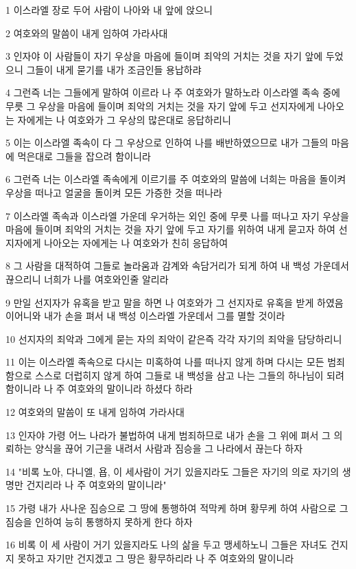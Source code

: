 \par 1 이스라엘 장로 두어 사람이 나아와 내 앞에 앉으니
\par 2 여호와의 말씀이 내게 임하여 가라사대
\par 3 인자야 이 사람들이 자기 우상을 마음에 들이며 죄악의 거치는 것을 자기 앞에 두었으니 그들이 내게 묻기를 내가 조금인들 용납하랴
\par 4 그런즉 너는 그들에게 말하여 이르라 나 주 여호와가 말하노라 이스라엘 족속 중에 무릇 그 우상을 마음에 들이며 죄악의 거치는 것을 자기 앞에 두고 선지자에게 나아오는 자에게는 나 여호와가 그 우상의 많은대로 응답하리니
\par 5 이는 이스라엘 족속이 다 그 우상으로 인하여 나를 배반하였으므로 내가 그들의 마음에 먹은대로 그들을 잡으려 함이니라
\par 6 그런즉 너는 이스라엘 족속에게 이르기를 주 여호와의 말씀에 너희는 마음을 돌이켜 우상을 떠나고 얼굴을 돌이켜 모든 가증한 것을 떠나라
\par 7 이스라엘 족속과 이스라엘 가운데 우거하는 외인 중에 무릇 나를 떠나고 자기 우상을 마음에 들이며 죄악의 거치는 것을 자기 앞에 두고 자기를 위하여 내게 묻고자 하여 선지자에게 나아오는 자에게는 나 여호와가 친히 응답하여
\par 8 그 사람을 대적하여 그들로 놀라움과 감계와 속담거리가 되게 하여 내 백성 가운데서 끊으리니 너희가 나를 여호와인줄 알리라
\par 9 만일 선지자가 유혹을 받고 말을 하면 나 여호와가 그 선지자로 유혹을 받게 하였음이어니와 내가 손을 펴서 내 백성 이스라엘 가운데서 그를 멸할 것이라
\par 10 선지자의 죄악과 그에게 묻는 자의 죄악이 같은즉 각각 자기의 죄악을 담당하리니
\par 11 이는 이스라엘 족속으로 다시는 미혹하여 나를 떠나지 않게 하며 다시는 모든 범죄함으로 스스로 더럽히지 않게 하여 그들로 내 백성을 삼고 나는 그들의 하나님이 되려 함이니라 나 주 여호와의 말이니라 하셨다 하라
\par 12 여호와의 말씀이 또 내게 임하여 가라사대
\par 13 인자야 가령 어느 나라가 불법하여 내게 범죄하므로 내가 손을 그 위에 펴서 그 의뢰하는 양식을 끊어 기근을 내려서 사람과 짐승을 그 나라에서 끊는다 하자
\par 14 "비록 노아, 다니엘, 욥, 이 세사람이 거기 있을지라도 그들은 자기의 의로 자기의 생명만 건지리라 나 주 여호와의 말이니라"
\par 15 가령 내가 사나운 짐승으로 그 땅에 통행하여 적막케 하며 황무케 하여 사람으로 그 짐승을 인하여 능히 통행하지 못하게 한다 하자
\par 16 비록 이 세 사람이 거기 있을지라도 나의 삶을 두고 맹세하노니 그들은 자녀도 건지지 못하고 자기만 건지겠고 그 땅은 황무하리라 나 주 여호와의 말이니라
